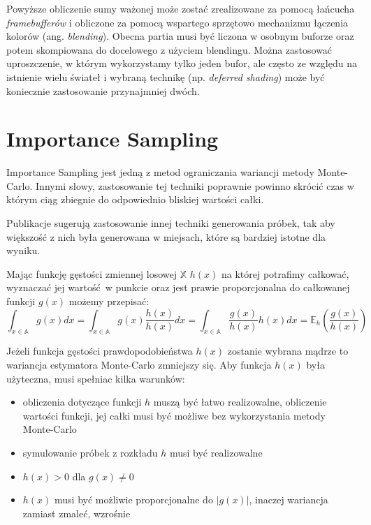 \documentclass[../main.tex]{subfiles}
\begin{document}
Powyższe obliczenie sumy ważonej może zostać zrealizowane za pomocą łańcucha \textit{framebufferów} i obliczone za pomocą wspartego sprzętowo mechanizmu łączenia kolorów (ang. \textit{blending}). Obecna partia musi być liczona w osobnym buforze oraz potem skompiowana do docelowego z użyciem blendingu. Można zastosować uproszczenie, w którym wykorzystamy tylko jeden bufor, ale często ze względu na istnienie wielu świateł i wybraną technikę (np. \textit{deferred shading}) może być koniecznie zastosowanie przynajmniej dwóch.

\section{Importance Sampling}

Importance Sampling jest jedną z metod ograniczania wariancji metody
Monte-Carlo. Innymi słowy, zastosowanie tej techniki poprawnie powinno
skrócić czas w którym ciąg zbiegnie do odpowiednio bliskiej wartości całki.

Publikacje \cite{Veach,MonteCarloAnderson} sugerują zastosowanie innej
techniki generowania próbek, tak aby większość z nich była generowana w
miejsach, które są bardziej istotne dla wyniku.

Mając funkcję gęstości zmiennej losowej $\mathbb{X}$ $h(x)$ na której potrafimy całkować, wyznaczać jej wartość w punkcie oraz jest prawie proporcjonalna do całkowanej funkcji $g(x)$ możemy przepisać:
\[
  \int_{x \in \mathbb{A}} { g(x) dx } =
  \int_{x \in \mathbb{A}} { g(x) \frac{h(x)}{h(x)} dx } =
  \int_{x \in \mathbb{A}} { \frac{g(x)}{h(x)} h(x) dx } =
  \mathbb{E}_{h}\left({ \frac{g(x)}{h(x)} }\right)
\]

Jeżeli funkcja gęstości prawdopodobieństwa $h(x)$ zostanie wybrana mądrze to
wariancja estymatora Monte-Carlo zmniejszy się. Aby funkcja $h(x)$ była
użyteczna, musi spełniac kilka warunków:

\begin{itemize}

  \item obliczenia dotyczące funkcji $h$ muszą być łatwo realizowalne,
    obliczenie wartości funkcji, jej całki musi być możliwe bez wykorzystania
    metody Monte-Carlo

  \item symulowanie próbek z rozkładu $h$ musi być realizowalne

  \item $h(x) > 0$ dla $g(x) \neq 0$

  \item $h(x)$ musi być możliwie proporcjonalne do $|g(x)|$, inaczej wariancja
    zamiast zmaleć, wzrośnie

\end{itemize}
\end{document}
